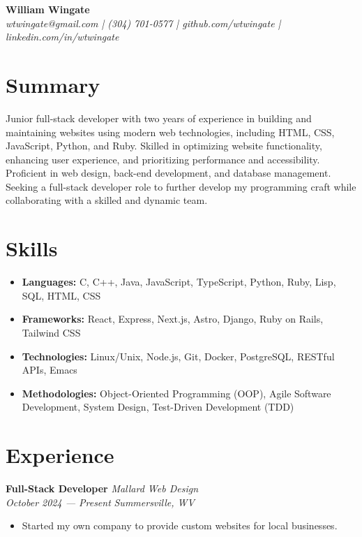 \documentclass[letterpaper, 11pt]{article}
\begin{document}
\thispagestyle{empty}


\begin{center}
  {\LARGE \textbf{William Wingate}} \\
  \vspace{10pt}
  \textit{wtwingate@gmail.com | (304) 701-0577 | github.com/wtwingate
    | linkedin.com/in/wtwingate}
\end{center}


\section*{Summary}
Junior full-stack developer with two years of experience in building
and maintaining websites using modern web technologies, including
HTML, CSS, JavaScript, Python, and Ruby.  Skilled in optimizing
website functionality, enhancing user experience, and prioritizing
performance and accessibility.  Proficient in web design, back-end
development, and database management.  Seeking a full-stack developer
role to further develop my programming craft while collaborating with
a skilled and dynamic team.


\section*{Skills}
\begin{itemize}
\item \textbf{Languages:} C, C++, Java, JavaScript, TypeScript,
  Python, Ruby, Lisp, SQL, HTML, CSS
\item \textbf{Frameworks:} React, Express, Next.js, Astro, Django,
  Ruby on Rails, Tailwind CSS
\item \textbf{Technologies:} Linux/Unix, Node.js, Git, Docker,
  PostgreSQL, RESTful APIs, Emacs
\item \textbf{Methodologies:} Object-Oriented Programming (OOP), Agile
  Software Development, System Design, Test-Driven Development (TDD)
\end{itemize}


\section*{Experience}
\textbf{Full-Stack Developer}
\hfill \textit{Mallard Web Design} \\
\textit{October 2024 — Present}
\hfill \textit{Summersville, WV}
\begin{itemize}
\item Started my own company to provide custom websites for local
  businesses.
\end{itemize}
\end{document}
